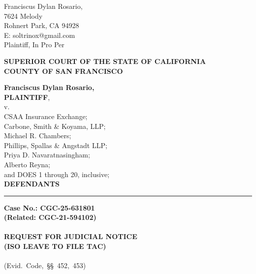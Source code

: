 

\nolinenumbers
\begin{singlespace}
Franciscus Dylan Rosario, \\
7624 Melody \\
Rohnert Park, CA 94928 \\
E: soltrinox@gmail.com \\
Plaintiff, In Pro Per \\
\end{singlespace}
\vspace*{9mm}
\begin{tightcenter}
\textbf{SUPERIOR COURT OF THE STATE OF CALIFORNIA} \\
\textbf{COUNTY OF SAN FRANCISCO}
\end{tightcenter}
\vspace*{2.25mm}
\nolinenumbers
\begin{minipage}[t]{3in}
    \raggedright
    \textbf{Franciscus Dylan Rosario,} \\ \textbf{PLAINTIFF}, \\
    \hspace{1cm} v. \\
    \small
    CSAA Insurance Exchange; \\
    Carbone, Smith \& Koyama, LLP; \\
    Michael R. Chambers; \\
    Phillips, Spallas \& Angstadt LLP; \\
    Priya D. Navaratnasingham; \\
    Alberto Reyna; \\
    and DOES 1 through 20, inclusive; \\
    \normalsize
    \textbf{DEFENDANTS}
    \makebox[3in]{\hrulefill}
\end{minipage}%
\hspace{3mm}
\begin{minipage}[t]{0.5pt}
    \vspace{0pt}
    \rule{0.5pt}{3.1in}
\end{minipage}
\hspace{3mm}
\begin{minipage}[t]{3in}
    \raggedright
    \noindent \textbf{Case No.: CGC-25-631801} \\
    \textbf{(Related: CGC-21-594102)} \\
    ~\\
    \textbf{REQUEST FOR JUDICIAL NOTICE} \\
    \textbf{(ISO LEAVE TO FILE TAC)} \\
    ~\\
    \mbox{(Evid. Code, \S\S\ 452, 453)}
\end{minipage}
\vspace*{6mm}
\linenumbers
